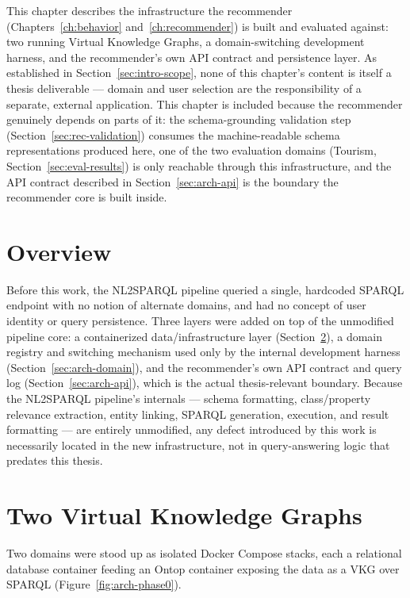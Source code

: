 This chapter describes the infrastructure the recommender (Chapters~\ref{ch:behavior}
and~\ref{ch:recommender}) is built and evaluated against: two running Virtual Knowledge Graphs, a
domain-switching development harness, and the recommender's own API contract and persistence
layer. As established in Section~\ref{sec:intro-scope}, none of this chapter's content is itself a
thesis deliverable --- domain and user selection are the responsibility of a separate, external
application. This chapter is included because the recommender genuinely depends on parts of it: the
schema-grounding validation step (Section~\ref{sec:rec-validation}) consumes the machine-readable
schema representations produced here, one of the two evaluation domains (Tourism,
Section~\ref{sec:eval-results}) is only reachable through this infrastructure, and the API contract
described in Section~\ref{sec:arch-api} is the boundary the recommender core is built inside.

\section{Overview}
\label{sec:arch-overview}

Before this work, the NL2SPARQL pipeline queried a single, hardcoded SPARQL endpoint with no
notion of alternate domains, and had no concept of user identity or query persistence. Three layers
were added on top of the unmodified pipeline core: a containerized data/infrastructure layer
(Section~\ref{sec:arch-vkgs}), a domain registry and switching mechanism used only by the internal
development harness (Section~\ref{sec:arch-domain}), and the recommender's own API contract and
query log (Section~\ref{sec:arch-api}), which is the actual thesis-relevant boundary. Because the
NL2SPARQL pipeline's internals --- schema formatting, class/property relevance extraction, entity
linking, SPARQL generation, execution, and result formatting --- are entirely unmodified, any defect
introduced by this work is necessarily located in the new infrastructure, not in query-answering
logic that predates this thesis.

\section{Two Virtual Knowledge Graphs}
\label{sec:arch-vkgs}

Two domains were stood up as isolated Docker Compose stacks, each a relational database container
feeding an Ontop container exposing the data as a VKG over SPARQL (Figure~\ref{fig:arch-phase0}).

